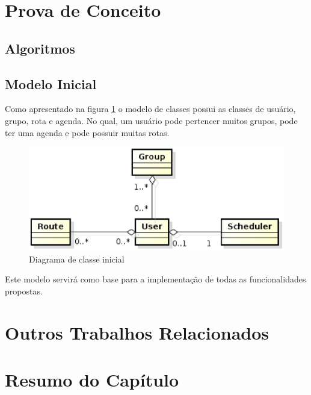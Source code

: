 \section{Prova de Conceito}

\subsection{Algoritmos}

\subsection{Modelo Inicial}

Como apresentado na figura \ref{diagrama de classe} o modelo de classes possui as classes de usuário, grupo, rota e agenda. No qual, um usuário pode pertencer muitos grupos, pode ter uma agenda e pode possuir muitas rotas.

\begin{figure}[!h]
	\centering
	\includegraphics[scale=0.55]{figuras/capitulo5/diagrama_classe.eps}
	\caption{Diagrama de classe inicial}
	\label{diagrama de classe}
\end{figure}

Este modelo servirá como base para a implementação de todas as funcionalidades propostas.

\section{Outros Trabalhos Relacionados}

\section{Resumo do Capítulo}
